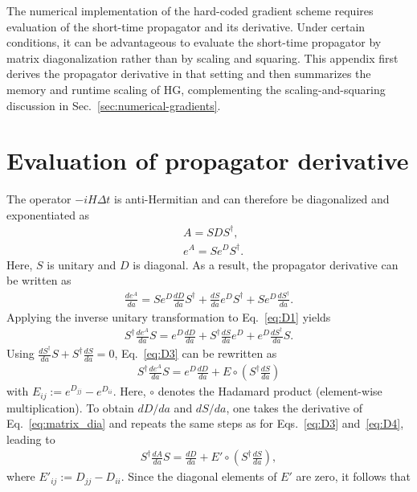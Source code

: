 \begin{appendices}
The numerical implementation of the hard-coded gradient scheme requires evaluation of the short-time propagator and its derivative. Under certain conditions, it can be advantageous to evaluate the short-time propagator by matrix diagonalization rather than by scaling and squaring. This appendix first derives the propagator derivative in that setting and then summarizes the memory and runtime scaling of HG, complementing the scaling-and-squaring discussion in Sec.~\ref{sec:numerical-gradients}.

\section{Evaluation of propagator derivative}
\label{sec:app_prop_deriv}

The operator $-iH\Delta t$ is anti-Hermitian and can therefore be diagonalized and exponentiated as
\begin{align}
\label{eq:matrix_dia}    &A=SDS^\dagger,\\
    &e^A=Se^DS^\dagger.
\end{align}
Here, $S$ is unitary and $D$ is diagonal. As a result, the propagator derivative can be written as
\begin{align}
\label{eq:D1}
    \frac{d e^{A}}{d a}=Se^D\frac{dD}{da}S^\dagger+\frac{dS}{da}e^DS^\dagger+Se^D\frac{dS^\dagger}{da}.
\end{align}
Applying the inverse unitary transformation to Eq.~\eqref{eq:D1} yields
\begin{align}
\label{eq:D3}
    S^\dagger\frac{de^A}{da}S=e^D\frac{dD}{da}+S^\dagger\frac{dS}{da}e^D+e^D\frac{dS^\dagger}{da}S.
\end{align}
Using $\frac{dS^\dagger}{da}S+S^\dagger\frac{dS}{da}=0$, Eq.~\eqref{eq:D3} can be rewritten as
\begin{align}
\label{eq:D4}
    S^\dagger \frac{de^A}{da}S=e^D\frac{dD}{da}+E\circ(S^\dagger\frac{dS}{da})
\end{align}
with $E_{ij}:=e^{D_{jj}}-e^{D_{ii}}$. Here, $\circ$ denotes the Hadamard product (element-wise multiplication). To obtain $dD/da$ and $dS/da$, one takes the derivative of Eq.~\eqref{eq:matrix_dia} and repeats the same steps as for Eqs.~\eqref{eq:D3} and~\eqref{eq:D4}, leading to
\begin{align}
\label{eq:D5}
    S^\dagger\frac{dA}{da}S=\frac{dD}{da}+E'\circ(S^\dagger\frac{dS}{da}),
\end{align}
where $E'_{ij}:=D_{jj}-D_{ii}$.
Since the diagonal elements of $E'$ are zero, it follows that

\end{appendices}
